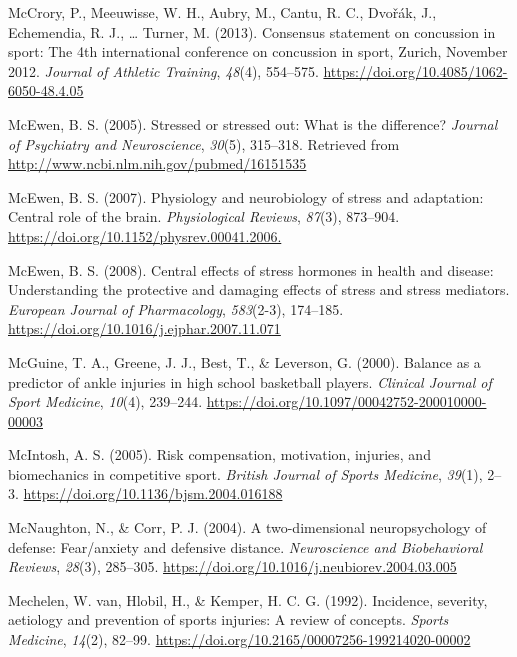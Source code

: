 \documentclass[
  english,
  man,floatsintext]{apa6}
\begin{document}
\leavevmode\hypertarget{ref-McCrory2013}{}%
McCrory, P., Meeuwisse, W. H., Aubry, M., Cantu, R. C., Dvořák, J., Echemendia, R. J., \ldots{} Turner, M. (2013). Consensus statement on concussion in sport: The 4th international conference on concussion in sport, Zurich, November 2012. \emph{Journal of Athletic Training}, \emph{48}(4), 554--575. \url{https://doi.org/10.4085/1062-6050-48.4.05}

\leavevmode\hypertarget{ref-McEwen2005}{}%
McEwen, B. S. (2005). Stressed or stressed out: What is the difference? \emph{Journal of Psychiatry and Neuroscience}, \emph{30}(5), 315--318. Retrieved from \url{http://www.ncbi.nlm.nih.gov/pubmed/16151535}

\leavevmode\hypertarget{ref-McEwen2007}{}%
McEwen, B. S. (2007). Physiology and neurobiology of stress and adaptation: Central role of the brain. \emph{Physiological Reviews}, \emph{87}(3), 873--904. \url{https://doi.org/10.1152/physrev.00041.2006.}

\leavevmode\hypertarget{ref-McEwen2008}{}%
McEwen, B. S. (2008). Central effects of stress hormones in health and disease: Understanding the protective and damaging effects of stress and stress mediators. \emph{European Journal of Pharmacology}, \emph{583}(2-3), 174--185. \url{https://doi.org/10.1016/j.ejphar.2007.11.071}

\leavevmode\hypertarget{ref-McGuine2000}{}%
McGuine, T. A., Greene, J. J., Best, T., \& Leverson, G. (2000). Balance as a predictor of ankle injuries in high school basketball players. \emph{Clinical Journal of Sport Medicine}, \emph{10}(4), 239--244. \url{https://doi.org/10.1097/00042752-200010000-00003}

\leavevmode\hypertarget{ref-McIntosh2005a}{}%
McIntosh, A. S. (2005). Risk compensation, motivation, injuries, and biomechanics in competitive sport. \emph{British Journal of Sports Medicine}, \emph{39}(1), 2--3. \url{https://doi.org/10.1136/bjsm.2004.016188}

\leavevmode\hypertarget{ref-McNaughton2004}{}%
McNaughton, N., \& Corr, P. J. (2004). A two-dimensional neuropsychology of defense: Fear/anxiety and defensive distance. \emph{Neuroscience and Biobehavioral Reviews}, \emph{28}(3), 285--305. \url{https://doi.org/10.1016/j.neubiorev.2004.03.005}

\leavevmode\hypertarget{ref-VanMechelen1992}{}%
Mechelen, W. van, Hlobil, H., \& Kemper, H. C. G. (1992). Incidence, severity, aetiology and prevention of sports injuries: A review of concepts. \emph{Sports Medicine}, \emph{14}(2), 82--99. \url{https://doi.org/10.2165/00007256-199214020-00002}
\end{document}
